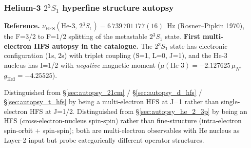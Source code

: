 \documentclass[11pt]{article}
\begin{document}
\subsubsection{Helium-3 $2{}^3\!S_1$ hyperfine structure autopsy}
\label{sec:autopsy_he3_hfs}

\textbf{Reference.} $\nu_\text{HFS}(\text{He-3},\,2{}^3\!S_1) =
6\,739\,701\,177(16)$~Hz (Rosner--Pipkin 1970), the F=3/2 to F=1/2 splitting
of the metastable $2{}^3\!S_1$ state. \textbf{First multi-electron HFS
autopsy in the catalogue.} The 2$^3\!S_1$ state has electronic
configuration (1s, 2s) with triplet coupling (S=1, L=0, J=1), and the
He-3 nucleus has I=1/2 with \emph{negative} magnetic moment
($\mu(\text{He-3}) = -2.127625\,\mu_N$, $g_\text{He3} = -4.25525$).

Distinguished from \S\ref{sec:autopsy_21cm} / \S\ref{sec:autopsy_d_hfs}
/ \S\ref{sec:autopsy_t_hfs} by being a multi-electron HFS at J=1 rather
than single-electron HFS at J=1/2.  Distinguished from
\S\ref{sec:autopsy_he_2_3p} by being an HFS (cross-electron-nucleus
spin-spin) rather than fine-structure (intra-electron spin-orbit +
spin-spin); both are multi-electron observables with He nucleus as
Layer-2 input but probe categorically different operator structures.
\end{document}
